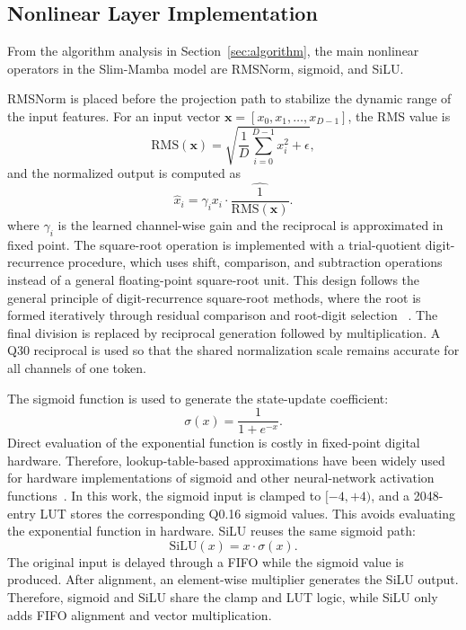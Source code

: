 \documentclass[lettersize,journal]{IEEEtran}
\begin{document}
\subsection{Nonlinear Layer Implementation}

From the algorithm analysis in Section~\ref{sec:algorithm}, the main nonlinear operators in
the Slim-Mamba model are RMSNorm, sigmoid, and SiLU.

RMSNorm is placed before the projection path to stabilize the dynamic range of
the input features. For an input vector
$\mathbf{x}=[x_0,x_1,\ldots,x_{D-1}]$, the RMS value is
\begin{equation}
\mathrm{RMS}(\mathbf{x})=
\sqrt{\frac{1}{D}\sum_{i=0}^{D-1}x_i^2+\epsilon},
\label{eq:rms_value}
\end{equation}
and the normalized output is computed as
\begin{equation}
\hat{x}_i =
\gamma_i x_i \cdot
\widehat{\frac{1}{\mathrm{RMS}(\mathbf{x})}} .
\label{eq:rmsnorm_output}
\end{equation}
where $\gamma_i$ is the learned channel-wise gain and the reciprocal is
approximated in fixed point.
The square-root operation is implemented with a trial-quotient digit-recurrence
procedure, which uses shift, comparison, and subtraction operations instead of a
general floating-point square-root unit. This design follows 
the general principle of digit-recurrence square-root methods, where the root is formed iteratively 
through residual comparison and root-digit selection ~\cite{Harris2024Radix4Sqrt,Bruguera2023Radix64Sqrt}. The final 
division is replaced by reciprocal generation followed by multiplication. A Q30 reciprocal 
is used so that the shared normalization scale remains accurate for all channels of one
token.

The sigmoid function is used to generate the state-update coefficient: 
\begin{equation} 
  \sigma(x)=\frac{1}{1+e^{-x}}. \label{eq:sigmoid} 
\end{equation} 
Direct evaluation of the exponential function is costly in fixed-point digital hardware. 
Therefore, lookup-table-based approximations have been widely used for hardware implementations of 
sigmoid and other neural-network activation functions~\cite{Meher2010SigmoidLUT,Piazza1993DigitalLUT}. 
In this work, the sigmoid input is clamped to $[-4,+4)$, and a 2048-entry LUT stores the corresponding Q0.16 sigmoid values. 
This avoids evaluating the exponential function in hardware. SiLU reuses the same sigmoid path:
\begin{equation}
\mathrm{SiLU}(x)=x\cdot\sigma(x).
\label{eq:silu}
\end{equation}
The original input is delayed through a FIFO while the sigmoid value is produced.
After alignment, an element-wise multiplier generates the SiLU output. Therefore,
sigmoid and SiLU share the clamp and LUT logic, while SiLU only adds FIFO
alignment and vector multiplication.
\end{document}
